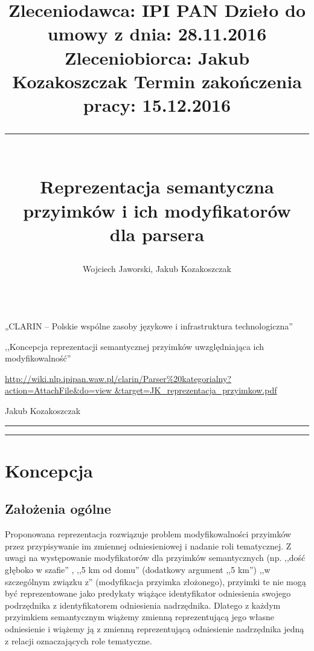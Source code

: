 \documentclass[a4paper, 12pt]{article}
\title{
\normalsize
\setlength{\topsep}{0pt} 
\noindent
Zleceniodawca: IPI PAN \hfill Dzieło do umowy z dnia:  28.11.2016 \\
Zleceniobiorca: Jakub Kozakoszczak \hfill Termin zakończenia pracy: 15.12.2016 \\
\rule{\linewidth}{2pt} \\[6pt] 
\huge Reprezentacja semantyczna \\ przyimków i ich modyfikatorów \\ dla parsera \eniam  \\[-2pt]}
\author{\Large Wojciech Jaworski, Jakub Kozakoszczak\\[6pt]
\hspace{-5pt}\rule{\linewidth}{2pt}  }
\date{}
\theoremstyle{remark}
\begin{document}

\maketitle

\vspace{-26pt}
\begin{description}
	\setlength{\itemsep}{4pt} 
	\setlength{\parskip}{0pt} 
	\item[Zrealizowane w ramach projektu:] „CLARIN -- Polskie wspólne zasoby językowe i infrastruktura technologiczna”
	\item[Tytuł pracy zamówionej:] ,,Koncepcja reprezentacji semantycznej przyimków uwzględniająca ich modyfikowalność''
	\item[Adres dzieła:] \url{http://wiki.nlp.ipipan.waw.pl/clarin/Parser%
	&target=JK_reprezentacja_przyimkow.pdf}
	\item[Opracowanie dokumentu:] Jakub Kozakoszczak
\end{description}

\vspace{6pt}
\hrule
\vspace{-14pt}
\renewcommand\contentsname{\normalsize{}}
\tableofcontents
\vspace{20pt}
\hrule
\newpage

\section{Koncepcja} %

\subsection{Założenia ogólne} %
\label{sub:zalożenia_oglne}


Proponowana reprezentacja rozwiązuje problem modyfikowalności przyimków przez przypisywanie im zmiennej odniesieniowej i nadanie roli tematycznej.
Z uwagi na występowanie modyfikatorów dla przyimków semantycznych (np. ,,dość głęboko w szafie'' , ,,5 km od domu'' (dodatkowy argument ,,5 km'') ,,w szczególnym związku z'' (modyfikacja przyimka złożonego), przyimki te nie mogą być reprezentowane jako predykaty wiążące identyfikator odniesienia swojego podrzędnika z identyfikatorem odniesienia nadrzędnika.
Dlatego z każdym przyimkiem semantycznym wiążemy zmienną reprezentującą jego własne odniesienie i wiążemy ją z zmienną reprezentującą odniesienie nadrzędnika jedną z relacji oznaczających role tematyczne.
\end{document}
